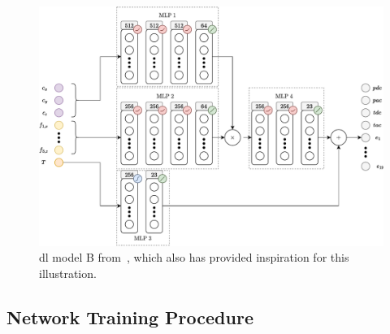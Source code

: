 \begin{figure}[!h]
		\begin{center}
			\includegraphics[width=\textwidth]{chapters/1-tactile-perception/fig/drawio/dl-model-tactile-perception-grouping-crop.pdf}
		\end{center}
		\caption{\gls{dl} model B from~\cite{simulation-of-the-syntouch-biotac-sensor}, which also has provided inspiration for this illustration.}
		\label{fig:dl-model-tactile-perception}
\end{figure}


\subsection{Network Training Procedure}\label{sec:1-tactile-perception-method-network-training-procedure}



